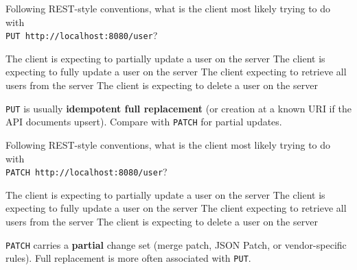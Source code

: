 \question[4]
Following REST-style conventions, what is the client most likely trying to do with\\
\texttt{PUT http://localhost:8080/user}?
\begin{choices}
  \choice The client is expecting to partially update a user on the server
  \CorrectChoice The client is expecting to fully update a user on the server
  \choice The client expecting to retrieve all users from the server
  \choice The client is expecting to delete a user on the server
\end{choices}
\begin{solution}
  \texttt{PUT} is usually \textbf{idempotent full replacement} (or creation at a known URI if the API documents upsert). Compare with \texttt{PATCH} for partial updates.
\end{solution}

\question[4]
Following REST-style conventions, what is the client most likely trying to do with\\
\texttt{PATCH http://localhost:8080/user}?
\begin{choices}
  \CorrectChoice The client is expecting to partially update a user on the server
  \choice The client is expecting to fully update a user on the server
  \choice The client expecting to retrieve all users from the server
  \choice The client is expecting to delete a user on the server
\end{choices}
\begin{solution}
  \texttt{PATCH} carries a \textbf{partial} change set (merge patch, JSON Patch, or vendor-specific rules). Full replacement is more often associated with \texttt{PUT}.
\end{solution}


